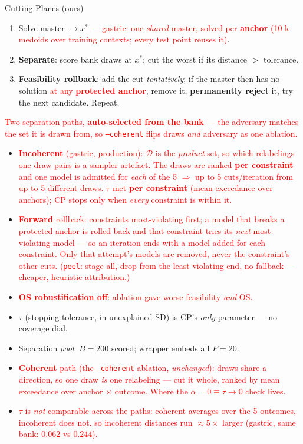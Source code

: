 \documentclass{beamer}
\newcommand{\mc}[1]{\textcolor{red}{#1}}
\begin{document}
\begin{frame}{Cutting Planes (ours)}
  \small
  \begin{enumerate}
    \item Solve master $\to x^\ast$ \mc{--- gastric: one \emph{shared} master, solved
      per \textbf{anchor} (10 k-medoids over training contexts; every test point
      reuses it)}.
    \item \textbf{Separate}: score bank draws at $x^\ast$; cut the worst if its
      distance $>$ tolerance.
    \item \textbf{Feasibility rollback}: add the cut \emph{tentatively}; if the master
      then has no solution \mc{at any \textbf{protected anchor}}, remove it,
      \textbf{permanently reject} it, try the next candidate. Repeat.
  \end{enumerate}
  \mc{Two separation paths, \textbf{auto-selected from the bank} --- the adversary
  matches the set it is drawn from, so \texttt{--coherent} flips draws \emph{and}
  adversary as one ablation.}
  \begin{itemize}
    \item \mc{\textbf{Incoherent} (gastric, production): $\mathcal D$ is the
      \emph{product} set, so which relabelings one draw pairs is a sampler
      artefact. The draws are ranked \textbf{per constraint} and one model is
      admitted for \emph{each} of the 5 $\Rightarrow$ up to 5 cuts/iteration from
      up to 5 different draws. $\tau$ met \textbf{per constraint} (mean exceedance
      over anchors); CP stops only when \emph{every} constraint is within it.}
    \item \mc{\textbf{Forward} rollback: constraints most-violating first; a model
      that breaks a protected anchor is rolled back and that constraint tries its
      \emph{next} most-violating model --- so an iteration ends with a model added
      for each constraint. Only that attempt's models are removed, never the
      constraint's other cuts. (\texttt{peel}: stage all, drop from the
      least-violating end, no fallback --- cheaper, heuristic attribution.)}
    \item \mc{\textbf{OS robustification off}: ablation gave worse feasibility \emph{and} OS.}
    \item $\tau$ (stopping tolerance, in unexplained SD) is CP's \emph{only}
      parameter --- no coverage dial.
    \item Separation \emph{pool}: $B{=}200$ scored; wrapper embeds all $P{=}20$.
    \item \mc{\textbf{Coherent} path (the \texttt{--coherent} ablation,
      \emph{unchanged}): draws share a direction, so one draw \emph{is} one
      relabeling --- cut it whole, ranked by mean exceedance over anchor $\times$
      outcome. Where the $\alpha{=}0\equiv\tau\to0$ check lives.}
    \item \mc{$\tau$ is \emph{not} comparable across the paths: coherent averages
      over the 5 outcomes, incoherent does not, so incoherent distances run
      ${\approx}5\times$ larger (gastric, same bank: $0.062$ vs $0.244$).}
  \end{itemize}
\end{frame}
\end{document}
